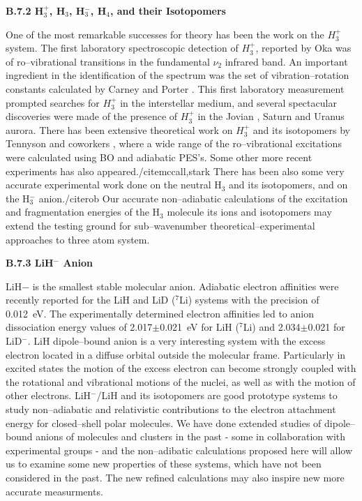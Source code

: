 {{\vspace{2mm}
\noindent
{\bf B.7.2 
H$_3^+$, H$_3$, H$_3^-$, H$_4$, and their Isotopomers}



One of the most remarkable successes
for theory has been the work on the $H_3^{+}$
system. The first laboratory spectroscopic detection of  $H_3^{+}$,
reported by Oka \cite{ref:k35} was of ro--vibrational transitions in the
fundamental $\nu_2$ infrared band. An important ingredient in the
identification of the spectrum was the set of vibration--rotation
constants calculated by Carney and Porter \cite{ref:k36}. This first
laboratory measurement prompted searches for $H_3^{+}$ in the interstellar
medium, and several spectacular discoveries were made of the presence
of $H_3^{+}$ in the Jovian \cite{ref:k41}, Saturn \cite{ref:k44} and
Uranus \cite{ref:k45} aurora. There has been 
extensive theoretical
work on $H_3^{+}$ and its isotopomers by Tennyson and coworkers
\cite{ref:ten2,ref:ten3,ref:ten4,ref:ten5,ref:ten6,ref:ten7,ref:ten8,%
ref:ten9}, where a wide range of the ro--vibrational excitations were
calculated using BO and adiabatic PES's. Some other
more recent experiments has also appeared./cite{mccall,stark} 
There has been also some very accurate experimental work
done on the neutral H$_3$ and its 
isotopomers,\cite{azinovic,muller} and on the H$_3^-$ anion./cite{rob}
Our accurate non--adiabatic calculations of the excitation
and fragmentation energies of the H$_3$ molecule its
ions and isotopomers may extend the testing ground for
sub--wavenumber theoretical--experimental approaches to 
three atom system.



\vspace{2mm}
\noindent
{\bf B.7.3
LiH$^-$ Anion}

LiH$-$ is the smallest stable molecular anion.
Adiabatic electron affinities were recently reported for 
the LiH and LiD ($^7$Li) systems with the precision
of 0.012~eV.\cite{sarkas}
The experimentally determined electron affinities led to
anion dissociation energy values of 2.017$\pm$0.021~eV 
for LiH ($^7$Li)
and 2.034$\pm$0.021 for LiD$^-$.
LiH dipole--bound anion is a very interesting system
with the excess electron located in a diffuse orbital
outside the molecular frame. Particularly in excited
states the motion of the excess electron can become strongly
coupled with the rotational and vibrational motions
of the nuclei, as well as with the motion of other electrons.
LiH$^-$/LiH and its isotopomers are good prototype 
systems to study
non--adiabatic and relativistic contributions 
to the electron attachment energy for closed--shell polar
molecules. We have done extended studies of dipole--bound
anions of molecules and clusters in the past - some
in collaboration with experimental groups - and
the non--adibatic calculations proposed here 
will allow us to examine some new properties of these 
systems, which have not been considered in the past. 
The new refined calculations may also inspire new more
accurate measurments.




}}
